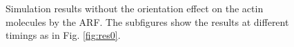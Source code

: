 \documentclass[a4paper,12pt, oneside]{book}
\begin{document}
\begin{figure}[tbp]
 \caption{Simulation results without the orientation effect on the actin molecules by the ARF. The subfigures show the results at different timings as in Fig. \ref{fig:res0}.}
 \label{fig:res4}
\end{figure}
\end{document}
